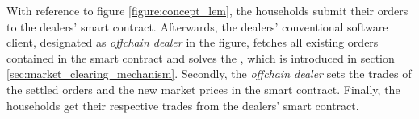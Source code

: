 With reference to figure \ref{figure:concept_lem}, the households submit their orders to the dealers' smart contract.  
Afterwards, the dealers' conventional software client, designated as \textit{offchain dealer} in the figure, fetches all existing orders contained in the smart contract
and solves the , which is introduced in section \ref{sec:market_clearing_mechanism}.
Secondly, the \textit{offchain dealer} sets the trades of the settled orders and the new market prices in the smart contract. 
Finally, the households get their respective trades from the dealers' smart contract. 


